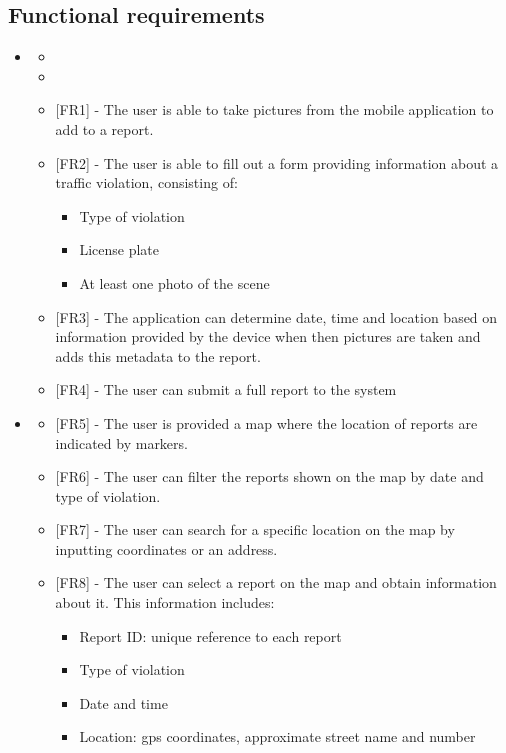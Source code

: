 \subsection{Functional requirements} \label{sub-sect:functional-requirements}
\begin{itemize}[label={}]
\item \textbf{\goalUserReport{}}
    \begin{itemize}[label={}]
        \item \assumptionLocation{}
        \item \assumptionDateTime{}
        \item {[FR1]} - The user is able to take pictures from the mobile application to add to a report.
        \item {[FR2]} - The user is able to fill out a form providing information about a traffic violation, consisting of:
        \begin{itemize}[label={\textbullet}]
            \item Type of violation
            \item License plate
            \item At least one photo of the scene
        \end{itemize}
        \item {[FR3]} - The application can determine date, time and location based on information provided by the device when then pictures are taken and adds this metadata to the report.
        \item {[FR4]} - The user can submit a full report to the system
    \end{itemize}

\item \textbf{\goalVisualizeReports}
    \begin{itemize}[label={}]
        \item {[FR5]} - The user is provided a map where the location of reports are indicated by markers.
        \item {[FR6]} - The user can filter the reports shown on the map by date and type of violation.
        \item {[FR7]} - The user can search for a specific location on the map by inputting coordinates or an address.
        \item {[FR8]} - The user can select a report on the map and obtain information about it. This information includes:
        \begin{itemize}[label={\textbullet}]
            \item Report ID: unique reference to each report
            \item Type of violation
            \item Date and time
            \item Location: gps coordinates, approximate street name and number
        \end{itemize}
    

\end{itemize}
\end{itemize}
